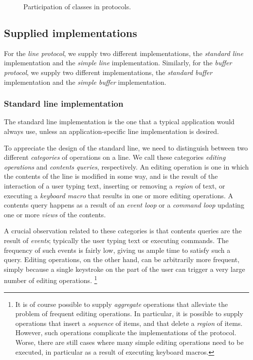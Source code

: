 \begin{figure}
\begin{center}
\end{center}
\caption{\label{fig-participation}
Participation of classes in protocols.}
\end{figure}

\subsection{Supplied implementations}

For the \emph{line protocol}, we supply two different implementations,
the \emph{standard line} implementation and the \emph{simple line}
implementation.  Similarly, for the \emph{buffer protocol}, we supply
two different implementations, the \emph{standard buffer} implementation
and the \emph{simple buffer} implementation.

\subsubsection{Standard line implementation}

The standard line implementation is the one that a typical application
would always use, unless an application-specific line implementation
is desired.

To appreciate the design of the standard line, we need to distinguish
between two different \emph{categories} of operations on a line.  We
call these categories \emph{editing operations} and \emph{contents
  queries}, respectively.  An editing operation is one in which the
contents of the line is modified in some way, and is the result of the
interaction of a user typing text, inserting or removing a
\emph{region} of text, or executing a \emph{keyboard macro} that
results in one or more editing operations.  A contents query happens
as a result of an \emph{event loop} or a \emph{command loop} updating
one or more \emph{views} of the contents.

A crucial observation related to these categories is that contents
queries are the result of \emph{events}; typically the user typing
text or executing commands.  The frequency of such events is fairly
low, giving us ample time to satisfy such a query.  Editing
operations, on the other hand, can be arbitrarily more frequent,
simply because a single keystroke on the part of the user can trigger
a very large number of editing operations.%
\footnote{It is of course possible to supply \emph{aggregate}
  operations that alleviate the problem of frequent editing
  operations.  In particular, it is possible to supply operations that
  insert a \emph{sequence} of items, and that delete a \emph{region}
  of items.  However, such operations complicate the implementations
  of the protocol.  Worse, there are still cases where many simple
  editing operations need to be executed, in particular as a result of
  executing keyboard macros.}

